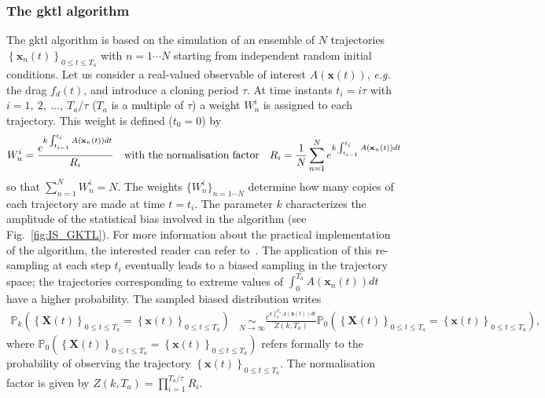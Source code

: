 \documentclass{jfm}
\begin{document}
\subsubsection{The \ac{gktl} algorithm}
\label{sec:gktl_description}
The \ac{gktl} algorithm is based on the simulation of an ensemble of $N$ trajectories $\left\{\mathbf{x}_{n}(t)\right\}_{0\leq t \leq T_a}$ with $ n =1 \cdots N$ starting from independent random initial conditions.
%
Let us consider a real-valued observable of interest $A(\mathbf{x}(t))$, {\emph{e.g.} the drag $f_d(t)$}, and introduce a cloning period $\tau$.
%
At time instants $t_{i}=i\tau$ with $i=1,~2,~...,~T_{a}/\tau$ ($T_{a}$ is a multiple of $\tau$) a weight $W_{n}^{i}$ is assigned to each trajectory. This weight is defined ($t_0=0$) by
%
\begin{equation}
W_{n}^{i}=\frac{e^{k\intop_{t_{i-1}}^{t_{i}}A(\mathbf{x}_{n}(t))dt}}{R_{i}}\quad \mbox{with the normalisation factor} \quad R_{i}=\frac{1}{N}\sum_{n=1}^{N}e^{k\int_{t_{i-1}}^{t_{i}}A(\mathbf{x}_{n}(t))dt}
\label{eq:Weight}
\end{equation}
so that $\sum_{n=1}^N W_n^i = N$.
%
%
{The weights $\{W_{n}^{i}\}_{n=1\cdots N}$ determine how many copies of each trajectory are made at time $t=t_i$. The parameter $k$ characterizes the amplitude of the statistical bias involved in the algorithm (see Fig.~\ref{fig:IS_GKTL}). For more information about the practical implementation of the algorithm, the interested reader can refer to~\citep{brewer2018efficient, lestang:tel-01974316}}.
The application of this re-sampling at each step $t_i$ eventually leads to a biased sampling in the trajectory space; the trajectories corresponding to extreme values of $\int_{0}^{T_a}A(\mathbf{x}_{n}(t))dt$ have a higher probability.
%
The sampled biased distribution writes
%
\begin{align}
\mathbb{P}_{k}\left(\left\{ \mathbf{X}(t)\right\} _{0\leq t\leq T_{a}}=\left\{ \mathbf{x}(t)\right\} _{0\leq t\leq T_{a}}\right) &\underset{N\rightarrow\infty}{\sim} \frac{e^{k\int_{0}^{T_{a}}A(\mathbf{x}(t))dt}}{Z(k,T_a)}\mathbb{\mathbb{P}}_{0}\left(\left\{ \mathbf{X}(t)\right\} _{0\leq t\leq T_{a}}=\left\{ \mathbf{x}(t)\right\} _{0\leq t\leq T_{a}}\right),
\label{eq:Biased_Path_Approximation}
\end{align}
where
$\mathbb{P}_{0}\left(\left\{ \mathbf{X}(t)\right\} _{0\leq t\leq T_{a}} = \left\{ \mathbf{x}(t)\right\} _{0\leq t\leq T_{a}}\right)$ 
refers formally to the probability of observing the trajectory 
$\left\{ \mathbf{x}(t)\right\} _{0\leq t\leq T_{a}}$.
The normalisation factor is given by $Z(k,T_a)=\prod_{i=1}^{T_a/\tau}R_i$.
\end{document}
